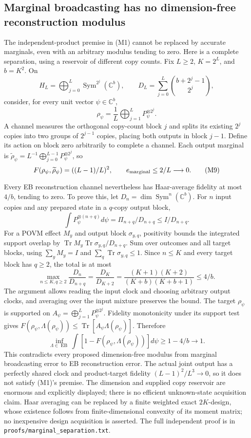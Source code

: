 \documentclass[11pt]{article}
\newcommand{\Tr}{\operatorname{Tr}}
\newcommand{\EB}{\operatorname{EB}}
\begin{document}
\subsection{Marginal broadcasting has no dimension-free reconstruction modulus}

The independent-product premise in (M1) cannot be replaced by accurate marginals, even with an arbitrary modulus tending to zero. Here is a complete separation, using a reservoir of different copy counts. Fix $L\ge2$, $K=2^L$, and $b=K^2$. On
\[
H_L=\bigoplus_{j=0}^L\operatorname{Sym}^{2^j}(\mathbb C^b),\qquad
D_L=\sum_{j=0}^L\binom{b+2^j-1}{2^j},
\]
consider, for every unit vector $\psi\in\mathbb C^b$,
\[
\rho_\psi=\frac1L\bigoplus_{j=1}^LP_\psi^{\otimes2^j}.
\]
A channel measures the orthogonal copy-count block $j$ and splits its existing $2^j$ copies into two groups of $2^{j-1}$ copies, placing both outputs in block $j-1$. Define its action on block zero arbitrarily to complete a channel. Each output marginal is
$\widetilde\rho_\psi=L^{-1}\bigoplus_{j=0}^{L-1}P_\psi^{\otimes2^j}$, so
\[
F(\rho_\psi,\widetilde\rho_\psi)=((L-1)/L)^2,
\qquad e_{\rm marginal}\le2/L\longrightarrow0.
\tag{M9}
\]

Every EB reconstruction channel nevertheless has Haar-average fidelity at most $4/b$, tending to zero. To prove this, let $D_n=\dim\operatorname{Sym}^n(\mathbb C^b)$. For $n$ input copies and any prepared state in a $q$-copy output block,
\[
\int P_\psi^{\otimes(n+q)}d\psi=\Pi_{n+q}/D_{n+q}\le I/D_{n+q}.
\]
For a POVM effect $M_y$ and output block $\sigma_{y,q}$, positivity bounds the integrated support overlap by $\Tr M_y\Tr\sigma_{y,q}/D_{n+q}$. Sum over outcomes and all target blocks, using $\sum_y M_y=I$ and $\sum_q\Tr\sigma_{y,q}\le1$. Since $n\le K$ and every target block has $q\ge2$, the total is at most
\[
\max_{n\le K,q\ge2}\frac{D_n}{D_{n+q}}
=\frac{D_K}{D_{K+2}}
=\frac{(K+1)(K+2)}{(K+b)(K+b+1)}\le4/b.
\]
The argument allows reading the input clock and choosing arbitrary output clocks, and averaging over the input mixture preserves the bound. The target $\rho_\psi$ is supported on $A_\psi=\bigoplus_{j=1}^LP_\psi^{\otimes2^j}$. Fidelity monotonicity under its support test gives $F(\rho_\psi,\Lambda(\rho_\psi))\le\Tr[A_\psi\Lambda(\rho_\psi)]$. Therefore
\[
\inf_{\Lambda\in\EB}\int[1-F(\rho_\psi,\Lambda(\rho_\psi))]d\psi
\ge1-4/b\longrightarrow1.
\tag{M10}
\]
This contradicts every proposed dimension-free modulus from marginal broadcasting error to EB reconstruction error. The actual joint output has a perfectly shared clock and product-target fidelity $(L-1)^2/L^3\to0$, so it does not satisfy (M1)'s premise. The dimension and supplied copy reservoir are enormous and explicitly displayed; there is no efficient unknown-state acquisition claim. Haar averaging can be replaced by a finite weighted exact $2K$-design, whose existence follows from finite-dimensional convexity of its moment matrix; no inexpensive design acquisition is asserted. The full independent proof is in \texttt{proofs/marginal\_separation.txt}.
\end{document}
